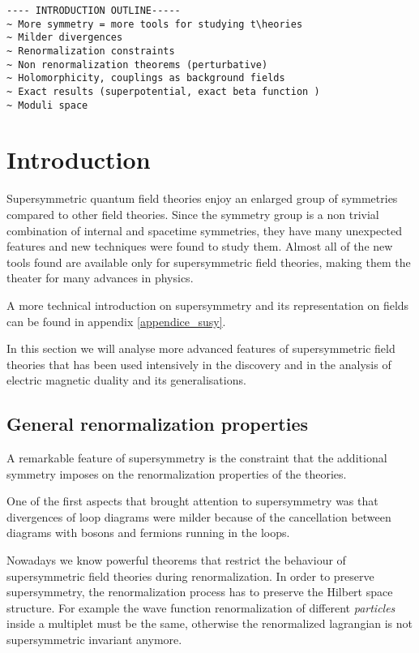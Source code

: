 \begin{lstlisting}
---- INTRODUCTION OUTLINE-----
~ More symmetry = more tools for studying t\heories
~ Milder divergences 
~ Renormalization constraints
~ Non renormalization theorems (perturbative)
~ Holomorphicity, couplings as background fields 
~ Exact results (superpotential, exact beta function )
~ Moduli space
\end{lstlisting}





\section{Introduction}
Supersymmetric quantum field theories enjoy an enlarged group of  symmetries compared to other field theories. 
Since the symmetry group is a non trivial combination of internal and spacetime symmetries, they have many unexpected features and new techniques were found to study them.
Almost all of the new tools found are available only for supersymmetric field theories, making them the theater for many advances in physics. 

A more technical introduction on supersymmetry and its representation on fields can be found in appendix \ref{appendice_susy}.

In this section we will analyse more advanced features of supersymmetric field theories that has been used intensively in the discovery and in the analysis of electric magnetic duality and its generalisations.













\subsection{General renormalization properties}

A remarkable feature of supersymmetry is the constraint that the additional symmetry imposes on the renormalization properties of the theories.

One of the first aspects that brought attention to supersymmetry was that divergences of loop diagrams were milder because of the cancellation between diagrams with bosons and fermions running in the loops. 

Nowadays we know powerful theorems that restrict the behaviour of supersymmetric field theories during renormalization.
In order to preserve supersymmetry, the renormalization process has to preserve the Hilbert space structure. For example the wave function renormalization of different \emph{particles} inside a multiplet must be the same, otherwise the renormalized lagrangian is not supersymmetric invariant anymore. 


